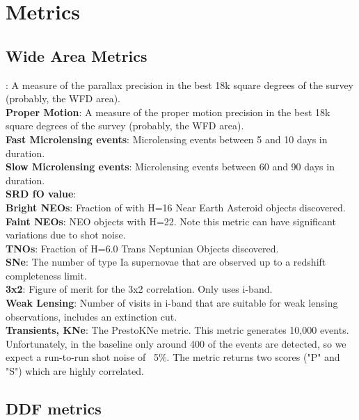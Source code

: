 \section{Metrics}



\subsection{Wide Area Metrics}

: A measure of the parallax precision in the best 18k square degrees of the survey (probably, the WFD area).  \\
{\bf Proper Motion}: A measure of the proper motion precision in the best 18k square degrees of the survey (probably, the WFD area). \\
{\bf Fast Microlensing events}: Microlensing events between 5 and 10 days in duration. \\
{\bf Slow Microlensing events}: Microlensing events between 60 and 90 days in duration.\\
{\bf SRD fO value}: \\
{\bf Bright NEOs}: Fraction of with H=16 Near Earth Asteroid objects discovered. \\
{\bf Faint NEOs}: NEO objects with H=22. Note this metric can have significant variations due to shot noise.\\
{\bf TNOs}: Fraction of H=6.0 Trans Neptunian Objects discovered.  \\
{\bf SNe}: The number of type Ia supernovae that are observed up to a redshift completeness limit. \\
{\bf 3x2}: Figure of merit for the 3x2 correlation. Only uses i-band. \\
{\bf Weak Lensing}: Number of visits in i-band that are suitable for weak lensing observations, includes an extinction cut. \\
{\bf Transients, KNe}: The PrestoKNe metric. This metric generates 10,000 events. Unfortunately, in the baseline only around 400 of the events are detected, so we expect a run-to-run shot noise of ~5\%. The metric returns two scores ("P" and "S") which are highly correlated.  \\


\subsection{DDF metrics}



